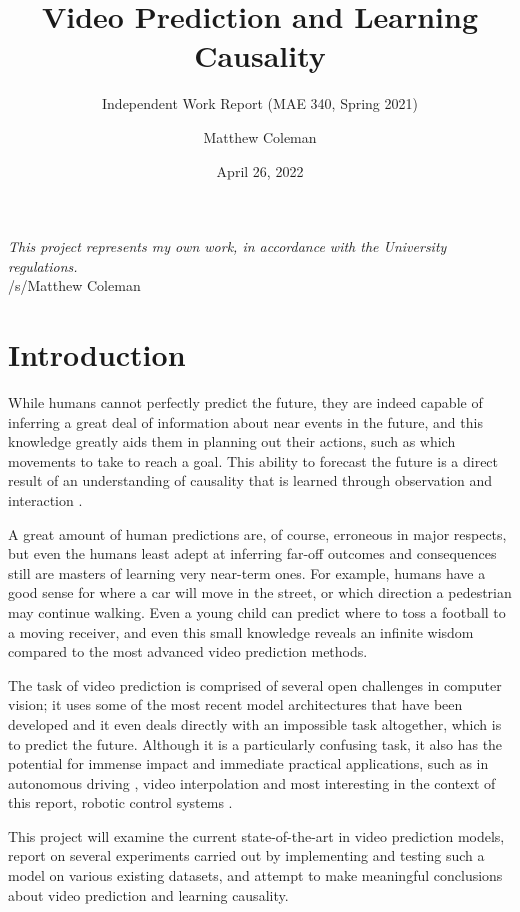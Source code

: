 \documentclass{scrartcl}
\title{Video Prediction and Learning Causality}
\subtitle{Independent Work Report (MAE 340, Spring 2021)}
\author{Matthew Coleman}
\date{April 26, 2022}
\begin{document}
\maketitle

\vspace{8cm}
\Large
\textit{This project represents my own work, in accordance with the University regulations.} \\
\hspace*{\fill} \large /s/Matthew Coleman
\normalsize

\newpage
\tableofcontents
\newpage

\section{Introduction}
\label{sec:intro}

While humans cannot perfectly predict the future, they are indeed capable of
inferring a great deal of information about near events in the future, and this
knowledge greatly aids them in planning out their actions, such as which
movements to take to reach a goal. This ability to forecast the future is a
direct result of an understanding of causality that is learned through
observation and interaction \cite{human_learning_sequences}.

A great amount of human predictions are, of course, erroneous in major
respects, but even the humans least adept at inferring far-off outcomes and
consequences still are masters of learning very near-term ones. For example,
humans have a good sense for where a car will move in the street, or which
direction a pedestrian may continue walking. Even a young child can predict
where to toss a football to a moving receiver, and even this small knowledge
reveals an infinite wisdom compared to the most advanced video prediction
methods.

The task of video prediction is comprised of several open challenges in
computer vision; it uses some of the most recent model architectures that have
been developed and it even deals directly with an impossible task altogether,
which is to predict the future. Although it is a particularly confusing task,
it also has the potential for immense impact and immediate practical
applications, such as in autonomous driving \cite{eg_self_driving}, video
interpolation \cite{eg_video_interp} and most interesting in the context of
this report, robotic control systems \cite{eg_robot_control}.

This project will examine the current state-of-the-art in video prediction
models, report on several experiments carried out by implementing and testing
such a model on various existing datasets, and attempt to make meaningful
conclusions about video prediction and learning causality.
\end{document}
